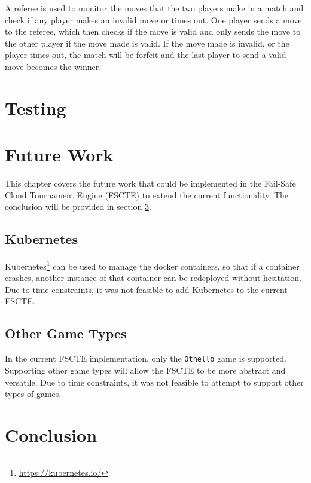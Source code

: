 \documentclass[a4paper, 12pt]{report}
\begin{document}
A referee is used to monitor the moves that the two players make in a match and
check if any player makes an invalid move or times out. One player sends a
move to the referee, which then checks if the move is valid and only sends
the move to the other player if the move made is valid. If the move made is
invalid, or the player times out, the match will be forfeit and the last player
to send a valid move becomes the winner.

\chapter{Testing}
\label{chap:testing}

\chapter{Future Work}
\label{chap:future}

This chapter covers the future work that could be implemented in the Fail-Safe
Cloud Tournament Engine (FSCTE) to extend the current functionality. The
conclusion will be provided in section \ref{chap:conclusion}.

\section{Kubernetes}

Kubernetes\footnote{\url{https://kubernetes.io/}} can be used to manage the docker
containers, so that if a container crashes, another instance of that container
can be redeployed without hesitation. Due to time constraints, it was not feasible
to add Kubernetes to the current FSCTE.

\section{Other Game Types}

In the current FSCTE implementation, only the \texttt{Othello} game is supported.
Supporting other game types will allow the FSCTE to be more abstract and versatile.
Due to time constraints, it was not feasible to attempt to support other types
of games.

\chapter{Conclusion}
\label{chap:conclusion}
\end{document}
